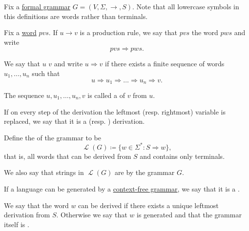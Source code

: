 \begin{definition}\label{def:grammar_derivation}\mcite\cite[page 104 \\ page 108]{Sipser2013}
  Fix a \hyperref[def:grammar]{formal grammar} \( G = (V, \Sigma, \to, S) \). Note that all lowercase symbols in this definitions are words rather than terminals.

  \begin{thmenum}
     Fix a \hyperref[def:language/word]{word} \( pvs \). If \( u \to v \) is a production rule, we say that \( pvs \)  the word \( pws \) and write
    \begin{equation*}
      pvs \Rightarrow pws.
    \end{equation*}

     We say that \( u \)  \( v \) and write \( u \Rightarrow v \) if there exists a finite sequence of words \( u_1, \ldots, u_n \) such that
    \begin{equation*}
      u \Rightarrow u_1 \Rightarrow \ldots \Rightarrow u_n \Rightarrow v.
    \end{equation*}

    The sequence \( u, u_1, \ldots, u_n, v \) is called a  of \( v \) from \( u \).

     If on every step of the derivation the leftmost (resp. rightmost) variable is replaced, we say that it is a  (resp. ) derivation.

     Define the  of the grammar to be
    \begin{equation*}
      \mscrL(G) \coloneqq \{ w \in \Sigma^* \colon S \Rightarrow w \},
    \end{equation*}
    that is, all words that can be derived from \( S \) and contains only terminals.

    We also say that strings in \( \mscrL(G) \) are  by the grammar \( G \).

    If a language can be generated by a \hyperref[def:grammar/context_free]{context-free grammar}, we say that it is a .

    \mcite\cite[def. 2.7]{Sipser2013}We say that the word \( w \) can be derived  if there exists a unique leftmost derivation from \( S \). Otherwise we say that \( w \) is generated  and that the grammar itself is .
  \end{thmenum}
\end{definition}

